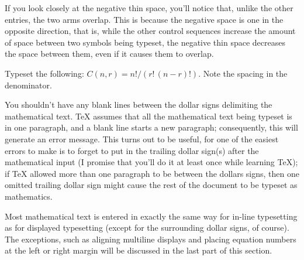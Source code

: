  
\toindex{\sp} 
\toindex{;} 
\toindex{>} 
\toindex{,} 
\toindex{!} 
 
If you look closely at the negative thin space, you'll notice 
that, unlike the other entries, the two arms overlap.  This is 
because the negative space is one in the opposite direction, that 
is, while the other control sequences increase the amount of 
space between two symbols being typeset, the negative thin space 
decreases the space between them, even if it causes them to 
overlap. 
 
\exercise Typeset the following: $C(n,r) = n!/(r!\,(n-r)!)$\null. Note the 
spacing in the denominator. 
\bigskip 
 
You shouldn't have any blank lines between the dollar signs 
delimiting the mathematical text. \TeX{} assumes that all the 
mathematical text being typeset is in one paragraph, and a blank 
line starts a new paragraph; consequently, this will generate an 
error message. This turns out to be useful, for one of the 
easiest errors to make is to forget to put in the trailing dollar 
sign(s) after the mathematical input (I promise that you'll do it 
at least once while learning \TeX{}); if \TeX{} allowed more than 
one paragraph to be between the dollars signs, then one omitted 
trailing dollar sign might cause the rest of the document to be 
typeset as mathematics. 
 
Most mathematical text is entered in exactly the same way for 
in-line typesetting as for displayed typesetting (except for the 
surrounding dollar signs, of course). The exceptions, such as 
aligning multiline displays and placing equation numbers at the 
left or right margin will be discussed in the last part of this 
section. 
 
